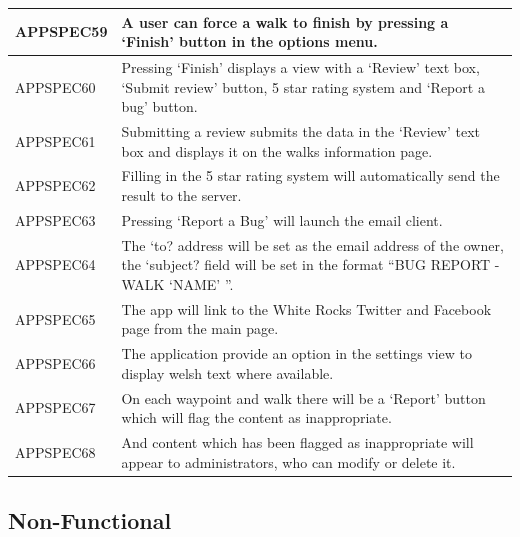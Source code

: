 \documentclass[11pt,a4paper]{article}
\begin{document}
\begin{longtable}{|p{2.5cm}p{13cm}|}
APPSPEC59 & A user can force a walk to finish by pressing a `Finish' button in the options menu. \\ \hline
APPSPEC60 & Pressing `Finish' displays a view with a `Review' text box, `Submit review' button, 5 star rating system and `Report a bug' button. \\ \hline
APPSPEC61 & Submitting a review submits the data in the `Review' text box and displays it on the walks information page.\\ \hline
APPSPEC62 & Filling in the 5 star rating system will automatically send the result to the server.\\ \hline
APPSPEC63 & Pressing `Report a Bug' will launch the email client. \\ \hline
APPSPEC64 & The `to? address will be set as the email address of the owner, the `subject? field will be set in the format ``BUG REPORT - WALK `NAME' ''.\\ \hline
APPSPEC65 & The app will link to the White Rocks Twitter and Facebook page from the main page.\\ \hline
APPSPEC66 & The application provide an option in the settings view to display welsh text where available. \\ \hline
APPSPEC67 & On each waypoint and walk there will be a `Report' button which will flag the content as inappropriate. \\ \hline
APPSPEC68 & And content which has been flagged as inappropriate will appear to administrators, who can modify or delete it. \\ \hline
\end{longtable}


\subsection{Non-Functional}
\label{sec:non-func-specs}
\end{document}
